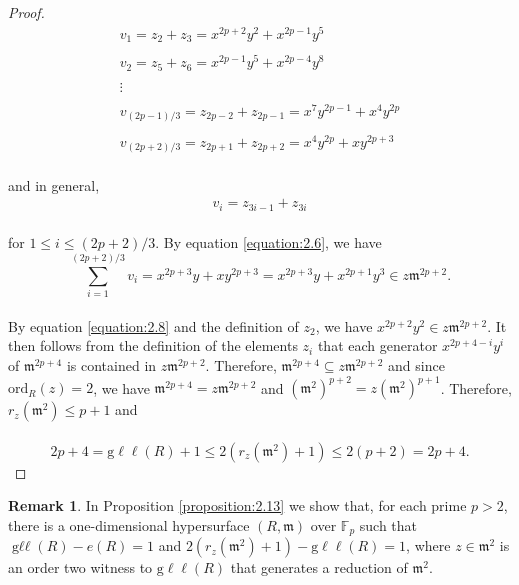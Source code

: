 \documentclass{amsart}
\theoremstyle{definition}
\theoremstyle{definition}
\newtheorem{remark}[theorem]{Remark}
\numberwithin{equation}{section}
\theoremstyle{definition}
\DeclareMathOperator{\Gll}{g\ell\ell}
\begin{document}
{\begin{proof}
\begin{align*}
&v_1 = z_2 + z_3 = x^{2p+2}y^2 + x^{2p-1}y^5&\\\\
&v_2 = z_5 +z _6 = x^{2p-1}y^5 + x^{2p-4}y^{8}&\\\\ 
&\vdots& \\\\
&v_{(2p-1)/3}=z_{2p-2} + z_{2p-1} = x^7 y^{2p-1} + x^4 y^{2p}&
\\\\
&v_{(2p+2)/3}= z_{2p+1} + z_{2p+2} = x^4 y^{2p} + xy^{2p+3}&
\end{align*} \text{}\\ and in general, 
\begin{align*}
&v_i = z_{3i-1} + z_{3i}&
\end{align*}\text{}\\
for $1 \leq i \leq (2p+2)/3$. By equation \ref{equation:2.6}, we have \\
\begin{equation}\label{equation:2.8}
\sum\limits_{i=1}^{(2p+2)/3} v_{i} = x^{2p+3}y + xy^{2p+3} = x^{2p+3}y + x^{2p+1}y^3 \in z \mathfrak{m}^{2p+2}.
\end{equation} \text{}\\ By equation \ref{equation:2.8} and the definition of $z_{2}$, we have $x^{2p+2}y^{2} \in z \mathfrak{m}^{2p+2}$. It then follows from the definition of the elements $z_i$ that each generator $x^{2p+4-i}y^i$ of $\mathfrak{m}^{2p+4}$ is contained in $z \mathfrak{m}^{2p+2}$. Therefore, $\mathfrak{m}^{2p+4} \subseteq z \mathfrak{m}^{2p+2}$ and since $\text{ord}_{R}(z)=2$, we have $\mathfrak{m}^{2p+4}=z \mathfrak{m}^{2p+2}$ and ${(\mathfrak{m}^2)}^{p+2}=z{(\mathfrak{m}^2)}^{p+1}$. Therefore, $r_{z}(\mathfrak{m}^2) \leq p+1$ and \\\\
\[
2p+4 = \text{g}\ell\ell(R)+1 \leq 2(r_{z}(\mathfrak{m}^2)+1) \leq 2\left(p+2\right)=2p+4.
\]
\end{proof}
\text{}
\begin{remark}
In Proposition \ref{proposition:2.13} we show that, for each prime $p>2$, there is a one-dimensional hypersurface $(R,\mathfrak{m})$ over $\mathbb{F}_p$ such that $\Gll(R)-e(R)=1$ and $2\left(r_{z}(\mathfrak{m}^2) +1 \right)-\text{g}\ell\ell(R)=1$, where $z \in \mathfrak{m}^2$ is an order two witness to $\text{g}\ell\ell(R)$ that generates a reduction of $\mathfrak{m}^2$.
\end{remark}
\text{}\\
}
\end{document}
